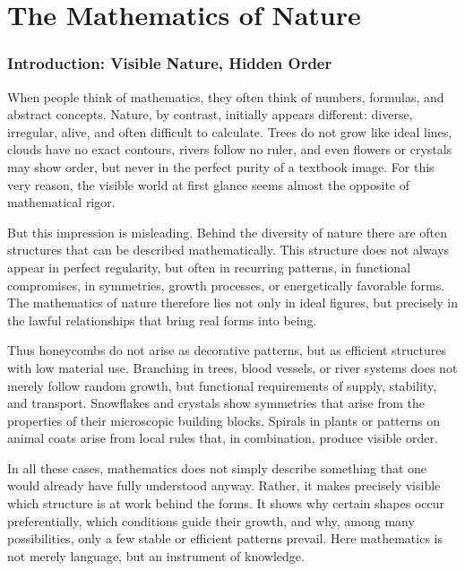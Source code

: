 \chapter{The Mathematics of Nature}
\label{chap:X_mathematics_of_nature}


\subsection{Introduction: Visible Nature, Hidden Order}

When people think of mathematics, they often think of numbers, formulas, and abstract concepts.
Nature, by contrast, initially appears different:
diverse, irregular, alive, and often difficult to calculate.
Trees do not grow like ideal lines,
clouds have no exact contours,
rivers follow no ruler,
and even flowers or crystals may show order,
but never in the perfect purity of a textbook image.
For this very reason, the visible world at first glance
seems almost the opposite of mathematical rigor.

But this impression is misleading.
Behind the diversity of nature there are often structures
that can be described mathematically.
This structure does not always appear in perfect regularity,
but often in recurring patterns,
in functional compromises,
in symmetries,
growth processes,
or energetically favorable forms.
The mathematics of nature therefore lies not only in ideal figures,
but precisely in the lawful relationships
that bring real forms into being.

Thus honeycombs do not arise as decorative patterns,
but as efficient structures with low material use.
Branching in trees,
blood vessels, or river systems
does not merely follow random growth,
but functional requirements of supply,
stability, and transport.
Snowflakes and crystals show symmetries
that arise from the properties of their microscopic building blocks.
Spirals in plants or patterns on animal coats arise from local rules
that, in combination, produce visible order.

In all these cases, mathematics does not simply describe something
that one would already have fully understood anyway.
Rather, it makes precisely visible
which structure is at work behind the forms.
It shows
why certain shapes occur preferentially,
which conditions guide their growth,
and why, among many possibilities, only a few stable
or efficient patterns prevail.
Here mathematics is not merely language,
but an instrument of knowledge.

